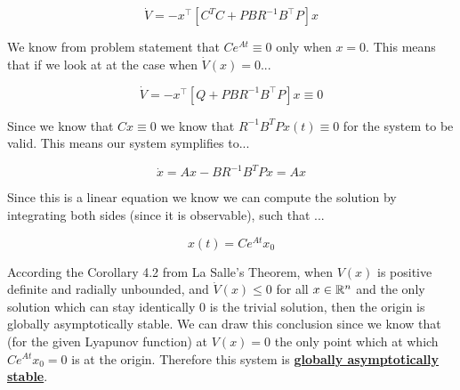$$
\dot{V}= -x^{\top}\left[C^TC + PBR^{-1} B^{\top} P\right] x
$$


\noindent We know from problem statement that $Ce^{At}\equiv 0 $ only when $x=0$. This means that if we look at at the case when $\dot{V}(x) = 0$...


$$
\dot{V}= -x^{\top}\left[Q + PBR^{-1} B^{\top} P\right] x \equiv 0
$$

Since we know that $Cx \equiv 0$ we know that $R^{-1}B^TPx(t) \equiv 0$ for the system to be valid. This means our system symplifies to...

$$
\dot{x} = Ax - BR^{-1}B^TPx = Ax
$$

\noindent Since this is a linear equation we know we can compute the solution by integrating both sides (since it is observable), such that ...

$$
x(t)  = C e^{At}x_0
$$


\noindent According the Corollary 4.2 from La Salle's Theorem, when $V(x)$ is positive definite and radially unbounded, and $\dot{V}(x)\leq0$ for all $x\in\mathbb{R}^n$ and the only solution which can stay identically 0 is the trivial solution, then the origin is globally asymptotically stable. We can draw this conclusion since we know that (for the given Lyapunov function) at $V(x) =0 $ the only point which at which $Ce^{At}x_0 = 0$ is at the origin. Therefore this system is \underline{\textbf{globally asymptotically stable}}.   
